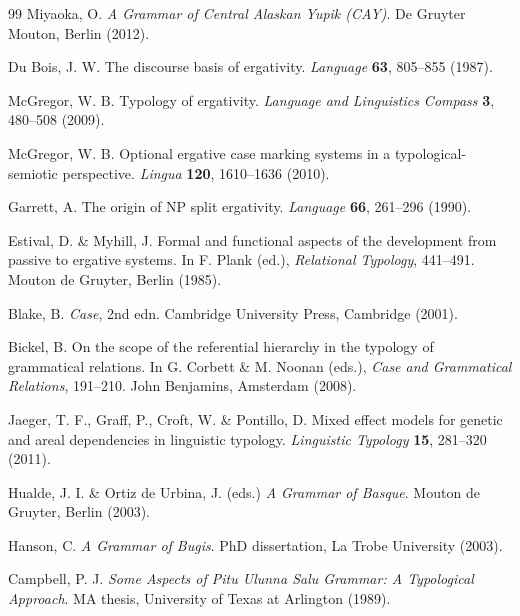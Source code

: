 \documentclass[12pt,a4paper]{article}
\begin{document}
\begin{thebibliography}{99}
Miyaoka, O.
\textit{A Grammar of Central Alaskan Yupik (CAY)}.
De Gruyter Mouton, Berlin (2012).

Du Bois, J. W.
The discourse basis of ergativity.
\textit{Language} \textbf{63}, 805--855 (1987).

McGregor, W. B.
Typology of ergativity.
\textit{Language and Linguistics Compass} \textbf{3}, 480--508 (2009).

McGregor, W. B.
Optional ergative case marking systems in a typological-semiotic perspective.
\textit{Lingua} \textbf{120}, 1610--1636 (2010).

Garrett, A.
The origin of NP split ergativity.
\textit{Language} \textbf{66}, 261--296 (1990).

Estival, D. \& Myhill, J.
Formal and functional aspects of the development from passive to ergative systems.
In F. Plank (ed.), \textit{Relational Typology}, 441--491. Mouton de Gruyter, Berlin (1985).

Blake, B.
\textit{Case}, 2nd edn.
Cambridge University Press, Cambridge (2001).

Bickel, B.
On the scope of the referential hierarchy in the typology of grammatical relations.
In G. Corbett \& M. Noonan (eds.), \textit{Case and Grammatical Relations},
191--210. John Benjamins, Amsterdam (2008).

Jaeger, T. F., Graff, P., Croft, W. \& Pontillo, D.
Mixed effect models for genetic and areal dependencies in linguistic typology.
\textit{Linguistic Typology} \textbf{15}, 281--320 (2011).

Hualde, J. I. \& Ortiz de Urbina, J. (eds.)
\textit{A Grammar of Basque}.
Mouton de Gruyter, Berlin (2003).

Hanson, C.
\textit{A Grammar of Bugis}.
PhD dissertation, La Trobe University (2003).

Campbell, P. J.
\textit{Some Aspects of Pitu Ulunna Salu Grammar: A Typological Approach}.
MA thesis, University of Texas at Arlington (1989).

\end{thebibliography}

\clearpage
\end{document}
